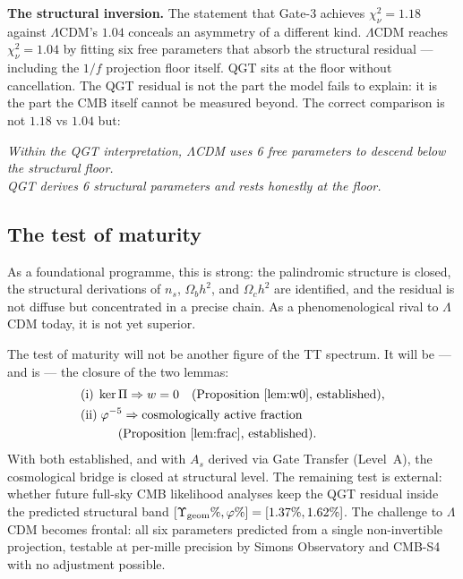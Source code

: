 \documentclass[twocolumn,10pt]{article}
\newcommand{\vp}{\varphi}
\newcommand{\kerPi}{\ker\Pi}
\begin{document}
\medskip
\noindent\textbf{The structural inversion.}
The statement that Gate-3 achieves $\chi^2_\nu=1.18$ against
$\Lambda$CDM's $1.04$ conceals an asymmetry of a different kind.
$\Lambda$CDM reaches $\chi^2_\nu=1.04$ by fitting six free
parameters that absorb the structural residual --- including the
$1/f$ projection floor itself. QGT sits at the floor without
cancellation. The QGT residual is not the part the model fails to
explain: it is the part the CMB itself cannot be measured beyond.
The correct comparison is not $1.18$ vs $1.04$ but:

\begin{center}
\itshape
Within the QGT interpretation, $\Lambda$CDM uses 6 free parameters to descend below the structural floor.\\[3pt]
QGT derives 6 structural parameters and rests honestly at the floor.
\end{center}

\subsection{The test of maturity}

As a foundational programme, this is strong: the palindromic
structure is closed, the structural derivations of $n_s$,
$\Omega_bh^2$, and $\Omega_ch^2$ are identified, and the residual
is not diffuse but concentrated in a precise chain. As a
phenomenological rival to $\Lambda$CDM today, it is not yet superior.

The test of maturity will not be another figure of the TT spectrum.
It will be — and is — the closure
of the two lemmas:
\begin{align*}
  &\text{(i)}\;\kerPi \Rightarrow w=0
    \quad\text{(Proposition~\ref{lem:w0}, established),} \\
  &\text{(ii)}\;\vp^{-5} \Rightarrow \text{cosmologically active fraction}\\
    &\hspace{3em}\text{(Proposition~\ref{lem:frac}, established).}
\end{align*}
With both established, and with $A_s$ derived via Gate Transfer (Level~A),
the cosmological bridge is closed at structural level.
The remaining test is external: whether future full-sky CMB likelihood
analyses keep the QGT residual inside the predicted structural band
$[\Upsilon_{\rm geom}\%,\vp\%]=[1.37\%,1.62\%]$.
The challenge to
$\Lambda$CDM becomes frontal: all six parameters predicted from a
single non-invertible projection, testable at per-mille precision by
Simons Observatory and CMB-S4 with no adjustment possible.
\end{document}

